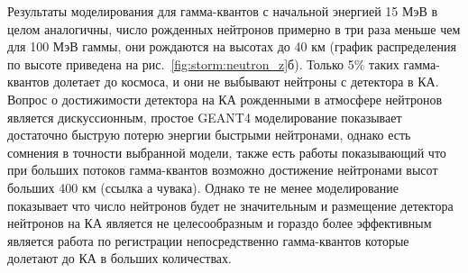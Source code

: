 Результаты моделирования для гамма-квантов с начальной энергией 15 МэВ в целом аналогичны, число рожденных нейтронов примерно в три раза меньше чем для 100 МэВ гаммы, они рождаются на высотах до 40 км (график распределения по высоте приведена на рис.~\ref{fig:storm:neutron_z}б). Только 5\% таких гамма-квантов долетает до космоса, и они не выбывают нейтроны с детектора в КА. Вопрос о достижимости детектора на КА рожденными в атмосфере нейтронов  является дискуссионным, простое GEANT4 моделирование показывает достаточно быструю потерю энергии быстрыми нейтронами, однако есть сомнения в точности выбранной модели, также есть работы показывающий что при больших потоков гамма-квантов возможно достижение нейтронами высот больших 400 км (ссылка а чувака). Однако те не менее моделирование показывает что число нейтронов будет не значительным и размещение детектора нейтронов на КА является не целесообразным и гораздо более эффективным является работа по  регистрации непосредственно гамма-квантов которые долетают до КА в больших количествах.
